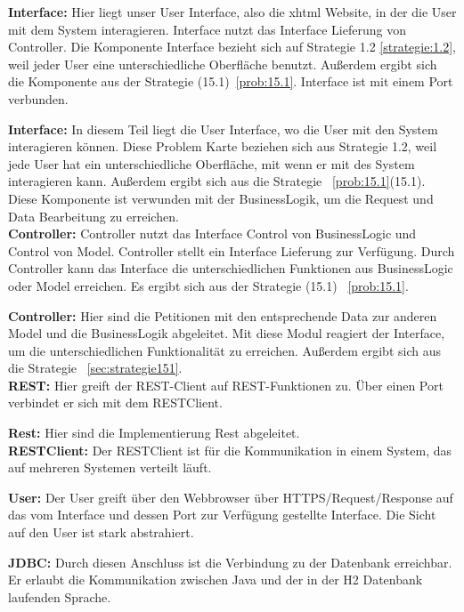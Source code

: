 \documentclass[enabledeprecatedfontcommands,fontsize=12pt,paper=a4,twoside]{scrartcl}
\begin{document}
{%
\textbf{Interface:} Hier liegt unser User Interface, also die xhtml Website, in der die User mit dem System interagieren. Interface nutzt das Interface Lieferung von Controller. Die Komponente Interface bezieht sich auf Strategie 1.2 \ref{strategie:1.2}, weil jeder User eine unterschiedliche Oberfläche benutzt. Außerdem ergibt sich die Komponente aus der Strategie (15.1)~\ref{prob:15.1}. Interface ist mit einem Port verbunden. 
}

\textbf{Interface:} In diesem Teil liegt die User Interface, wo die User mit den System interagieren können. Diese Problem Karte beziehen sich aus Strategie 1.2, weil jede User hat ein unterschiedliche Oberfläche, mit wenn er mit des System interagieren kann. Außerdem ergibt sich aus die Strategie ~\ref{prob:15.1}(15.1). Diese Komponente ist verwunden mit der BusinessLogik, um die Request und Data Bearbeitung zu erreichen.\\

{%
\textbf{Controller:} Controller nutzt das Interface Control von BusinessLogic und Control von Model. Controller stellt ein Interface Lieferung zur Verfügung. Durch Controller kann das Interface die unterschiedlichen Funktionen aus BusinessLogic oder Model erreichen. Es ergibt sich aus der Strategie (15.1) ~\ref{prob:15.1}.
}

\textbf{Controller:} Hier sind die Petitionen mit den entsprechende Data zur anderen Model und die BusinessLogik abgeleitet. Mit diese Modul reagiert der Interface,  um die unterschiedlichen Funktionalität zu erreichen. Außerdem ergibt sich aus die Strategie ~\ref{sec:strategie151}.  \\

{%
\textbf{REST:} Hier greift der REST-Client auf REST-Funktionen zu. Über einen Port verbindet er sich mit dem RESTClient. 
}

\textbf{Rest:} Hier sind die Implementierung Rest abgeleitet. \\

{%
\textbf{RESTClient:} Der RESTClient ist für die Kommunikation in einem System, das auf mehreren Systemen verteilt läuft. 
}

{%
\textbf{User:} Der User greift über den Webbrowser über HTTPS/Request/Response auf das vom Interface und dessen Port zur Verfügung gestellte Interface. Die Sicht auf den User ist stark abstrahiert.
}

{%
\textbf{JDBC:} Durch diesen Anschluss ist die Verbindung zu der Datenbank erreichbar. Er erlaubt die Kommunikation zwischen Java und der in der H2 Datenbank laufenden Sprache.
}
\end{document}
